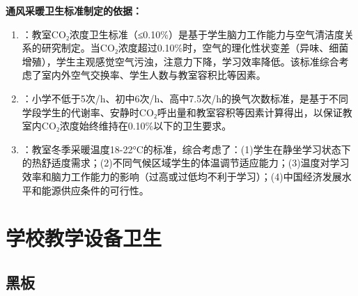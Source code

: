 \begin{tipbox}
\textbf{通风采暖卫生标准制定的依据：}

\begin{enumerate}[leftmargin=*]
    \item {}：教室CO₂浓度卫生标准（≤0.10\%）是基于学生脑力工作能力与空气清洁度关系的研究制定。当CO₂浓度超过0.10\%时，空气的理化性状变差（异味、细菌增殖），学生主观感觉空气污浊，注意力下降，学习效率降低。该标准综合考虑了室内外空气交换率、学生人数与教室容积比等因素。

    \item {}：小学不低于5次/h、初中6次/h、高中7.5次/h的换气次数标准，是基于不同学段学生的代谢率、安静时CO₂呼出量和教室容积等因素计算得出，以保证教室内CO₂浓度始终维持在0.10\%以下的卫生要求。

    \item {}：教室冬季采暖温度18-22°C的标准，综合考虑了：(1)学生在静坐学习状态下的热舒适度需求；(2)不同气候区域学生的体温调节适应能力；(3)温度对学习效率和脑力工作能力的影响（过高或过低均不利于学习）；(4)中国经济发展水平和能源供应条件的可行性。
\end{enumerate}
\end{tipbox}

\section{学校教学设备卫生}

\subsection{黑板}

